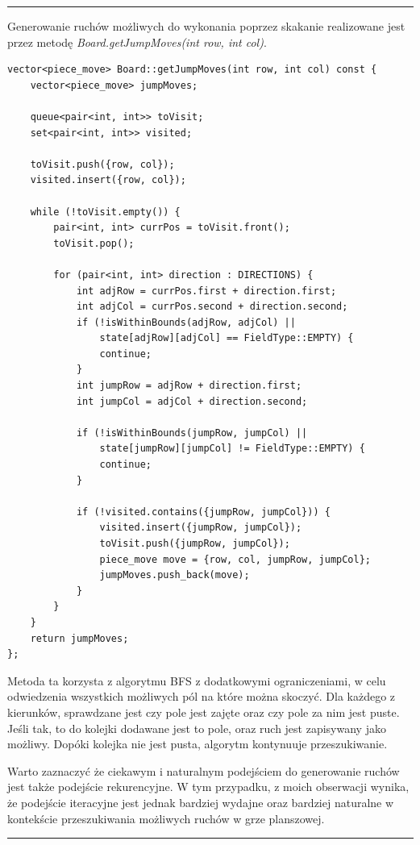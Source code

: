 \documentclass[a4paper, 12pt]{article}
\begin{document}
\vspace{0.5cm}
\hrule
\vspace{1cm}
Generowanie ruchów możliwych do wykonania poprzez skakanie 
realizowane jest przez metodę \textit{Board.getJumpMoves(int row, int col)}.
\begin{lstlisting}
vector<piece_move> Board::getJumpMoves(int row, int col) const {
    vector<piece_move> jumpMoves;

    queue<pair<int, int>> toVisit;
    set<pair<int, int>> visited;

    toVisit.push({row, col});
    visited.insert({row, col});

    while (!toVisit.empty()) {
        pair<int, int> currPos = toVisit.front();
        toVisit.pop();

        for (pair<int, int> direction : DIRECTIONS) {
            int adjRow = currPos.first + direction.first;
            int adjCol = currPos.second + direction.second;
            if (!isWithinBounds(adjRow, adjCol) ||
                state[adjRow][adjCol] == FieldType::EMPTY) {
                continue;
            }
            int jumpRow = adjRow + direction.first;
            int jumpCol = adjCol + direction.second;

            if (!isWithinBounds(jumpRow, jumpCol) ||
                state[jumpRow][jumpCol] != FieldType::EMPTY) {
                continue;
            }

            if (!visited.contains({jumpRow, jumpCol})) {
                visited.insert({jumpRow, jumpCol});
                toVisit.push({jumpRow, jumpCol});
                piece_move move = {row, col, jumpRow, jumpCol};
                jumpMoves.push_back(move);
            }
        }
    }
    return jumpMoves;
};
\end{lstlisting}
Metoda ta korzysta z algorytmu BFS z dodatkowymi ograniczeniami,
w celu odwiedzenia wszystkich możliwych pól na które można skoczyć.
Dla każdego z kierunków, sprawdzane jest czy pole jest zajęte
oraz czy pole za nim jest puste. Jeśli tak, to do kolejki 
dodawane jest to pole, oraz ruch jest zapisywany jako możliwy.
Dopóki kolejka nie jest pusta, algorytm kontynuuje przeszukiwanie.


Warto zaznaczyć że ciekawym i naturalnym 
podejściem do generowanie ruchów jest także podejście rekurencyjne.
W tym przypadku, z moich obserwacji wynika, że podejście iteracyjne 
jest jednak bardziej wydajne oraz bardziej naturalne w kontekście
przeszukiwania możliwych ruchów w grze planszowej.
\vspace{0.5cm}
\hrule
\vspace{1cm}
\end{document}
